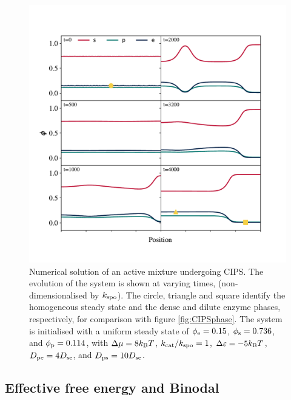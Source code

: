 \begin{figure}
    \centering
    \includegraphics[width=\textwidth]{figures/CIPSnumeric.pdf}
    \caption{Numerical solution of an active mixture undergoing CIPS. The evolution of the system is shown at varying times, (non-dimensionalised by $k_{\mathrm{spo}}$). The circle, triangle and square identify the homogeneous steady state and the dense and dilute enzyme phases, respectively, for comparison with figure \ref{fig:CIPSphase}. The system is initialised with a uniform steady state of $\phi_{\mathrm{e}}=0.15$, $\phi_{\mathrm{s}}=0.736$, and $\phi_{\mathrm{p}}=0.114$, with $\Delta\mu=8 k_{\rm B} T$, $k_{\mathrm{cat}}/k_{\mathrm{spo}}=1$, $\Delta \varepsilon=-5 k_{\rm B} T$, $D_{\mathrm{pe}}=4 D_{\mathrm{se}}$, and $D_{\mathrm{ps}}=10 D_{\mathrm{se}}$.}
    \label{fig:CIPSnumeric}
\end{figure}

\subsection{Effective free energy and Binodal}

